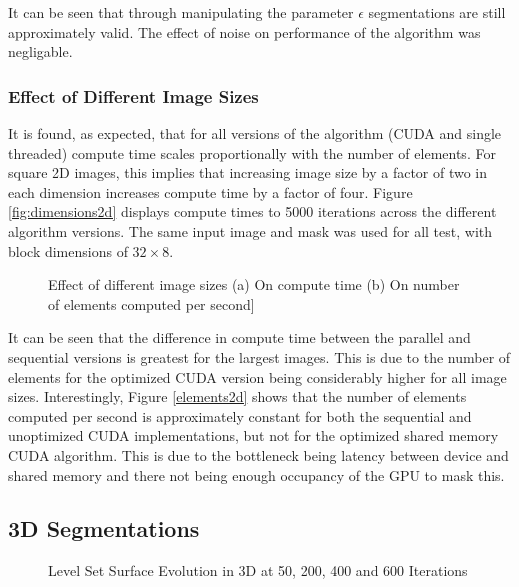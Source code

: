 It can be seen that through manipulating the parameter $\epsilon$ segmentations are still approximately valid. The effect of noise on performance of the algorithm was negligable.

\subsubsection{Effect of Different Image Sizes}\label{dimensions2d}

It is found, as expected, that for all versions of the algorithm (CUDA and single threaded) compute time scales proportionally with the number of elements. For square 2D images, this implies that increasing image size by a factor of two in each dimension increases compute time by a factor of four. Figure \ref{fig:dimensions2d} displays compute times to 5000 iterations across the different algorithm versions. The same input image and mask was used for all test, with block dimensions of $32 \times 8$.

\begin{figure}[p]
	\begin{flushleft}
	\end{flushleft}
	\label{fig:speed}\caption{Effect of different image sizes (a) On compute time (b) On number of elements computed per second]}
\end{figure}

It can be seen that the difference in compute time between the parallel and sequential versions is greatest for the largest images. This is due to the number of elements for the optimized CUDA version being considerably higher for all image sizes. Interestingly, Figure \ref{elements2d} shows that the number of elements computed per second is approximately constant for both the sequential and unoptimized CUDA implementations, but not for the optimized shared memory CUDA algorithm. This is due to the bottleneck being latency between device and shared memory and there not being enough occupancy of the GPU to mask this.




\subsection{3D Segmentations}

\begin{figure}[h]
  \begin{center}
  \end{center}
  \caption{Level Set Surface Evolution in 3D at 50, 200, 400 and 600 Iterations}
  \label{fig:evolution}
\end{figure}

